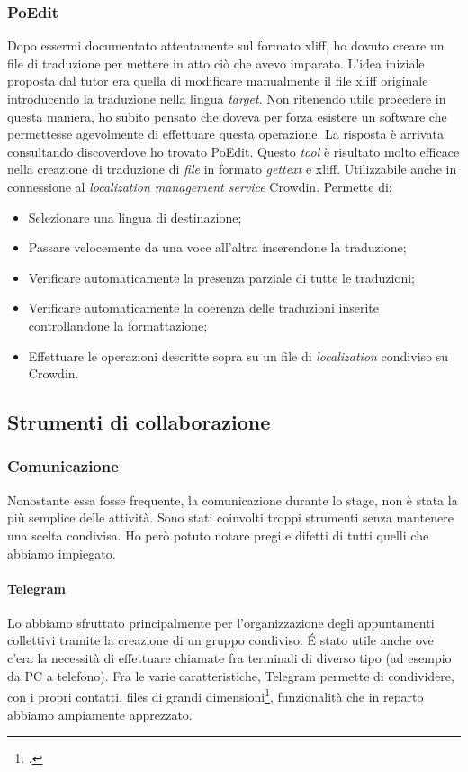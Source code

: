 \subsubsection{PoEdit}
Dopo essermi documentato attentamente sul formato \acrshort{xliff}, ho dovuto creare un file di traduzione per mettere in atto ciò che avevo imparato. L'idea iniziale proposta dal tutor era quella di modificare manualmente il file \acrshort{xliff} originale introducendo la traduzione nella lingua \textit{target}. Non ritenendo utile procedere in questa maniera, ho subito pensato che doveva per forza esistere un software che permettesse agevolmente di effettuare questa operazione. La risposta è arrivata consultando \gls{discover}\glsfirstoccur dove ho trovato PoEdit.
Questo \textit{tool} è risultato molto efficace nella creazione di traduzione di \textit{file} in formato \emph{gettext} e \acrshort{xliff}. Utilizzabile anche in connessione al \textit{localization management service} Crowdin. Permette di:
\begin{itemize}
    \item Selezionare una lingua di destinazione;
    \item Passare velocemente da una voce all'altra inserendone la traduzione;
    \item Verificare automaticamente la presenza parziale di tutte le traduzioni;
    \item Verificare automaticamente la coerenza delle traduzioni inserite controllandone la formattazione;
    \item Effettuare le operazioni descritte sopra su un file di \textit{localization} condiviso su Crowdin.
\end{itemize}

\subsection{Strumenti di collaborazione}
\subsubsection{Comunicazione}
Nonostante essa fosse frequente, la comunicazione durante lo stage, non è stata la più semplice delle attività. Sono stati coinvolti troppi strumenti senza mantenere una scelta condivisa. Ho però potuto notare pregi e difetti di tutti quelli che abbiamo impiegato.
\paragraph{Telegram} Lo abbiamo sfruttato principalmente per l'organizzazione degli appuntamenti collettivi tramite la creazione di un gruppo condiviso. \'E stato utile anche ove c'era la necessità di effettuare chiamate fra terminali di diverso tipo (ad esempio da PC a telefono).
Fra le varie caratteristiche, Telegram permette di condividere, con i propri contatti, files di grandi dimensioni\footcite{site:telegram}, funzionalità che in reparto abbiamo ampiamente apprezzato.
